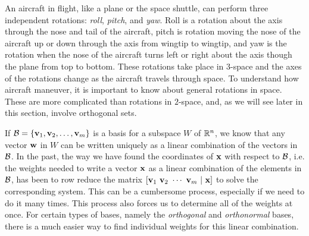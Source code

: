  \label{chap:orthogonal_basis}

\vspace*{-17 pt}

\vspace*{13 pt}

\label{sec:appl_3d_rotate}

An aircraft in flight, like a plane or the space shuttle, can perform three independent rotations: \emph{roll}, \emph{pitch}, and \emph{yaw}. Roll is a rotation about the axis through the nose and tail of the aircraft, pitch is rotation moving the nose of the aircraft up or down through the axis from wingtip to wingtip, and yaw is the rotation when the nose of the aircraft turns left or right about the axis though the plane from top to bottom. These rotations take place in $3$-space and the axes of the rotations change as the aircraft travels through space. To understand how aircraft maneuver, it is important to know about general rotations in space. These are more complicated than rotations in $2$-space, and, as we will see later in this section, involve orthogonal sets. 

\label{sec:orthog_set_intro}

If $\mathcal{B} = \{\mathbf{v}_1, \mathbf{v}_2, \ldots, \mathbf{v}_m\}$ is a basis for a subspace $W$ of $\mathbb{R}^n$, we know that any vector $\mathbf{w}$ in $W$ can be written uniquely as a linear combination of the vectors in $\mathcal{B}$. In the past, the way we have found the coordinates of $\mathbf{x}$ with respect to $\mathcal{B}$, i.e. the weights needed to write a vector $\mathbf{x}$ as a linear combination of the elements in $\mathcal{B}$, has been to row reduce the matrix $[\vv_1  \ \vv_2  \ \cdots  \ \vv_m \ | \ \vx]$ to solve the corresponding system. This can be a cumbersome process, especially if we need to do it many times. This process also forces us to determine all of the weights at once. For certain types of bases, namely the \emph{orthogonal} and \emph{orthonormal} bases, there is a much easier way to find individual weights for this linear combination.

